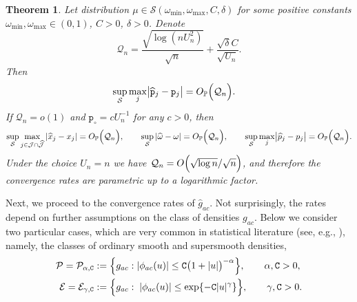\documentclass[numbers,webpdf,imaiai]{ima-authoring-template}%
\theoremstyle{thmstyletwo}%
\newtheorem{theorem}{Theorem}%
\newtheorem{remark}{Remark}%
\renewcommand{\P}{\mathbb{P}}
\newcommand{\p}{\mathtt{p}}
\newcommand{\w}{\omega}
\newcommand{\eps}{\varepsilon}
\newcommand{\mJ}{\mathcal{J}}
\newcommand{\mQ}{\mathcal{Q}}
\numberwithin{equation}{section}
\begin{document}
\begin{theorem}\label{thm1}
Let distribution $\mu \in \mathcal{S}(\w_{\min}, \w_{\max}, C,\delta)$ for some positive constants $\w_{\min}, \w_{\max} \in (0,1)$, $C>0$, \(\delta>0\). Denote
\begin{equation*}
    \mQ_n =
\frac{\sqrt{\log(nU^2_n)}}{\sqrt{n}} + \frac{\sqrt{\delta}C}{\sqrt{U_n}}.
\end{equation*}
Then 
\begin{align}\label{ratepj}
    \sup_{\mathcal{S}} \max_{j} \bigl| \widehat{\p}_j - \p_j \bigr| &= O_{\mathbb{P}}\Bigl(\mQ_n\Bigr).
    \end{align}
If \(\mQ_n=o(1)\) and \(\p_\circ= c U_n^{-1}\) for any \(c>0\), then  
    \begin{align*} 
\sup_{\mathcal{S}} \max_{j \in \mJ \cap \widehat{\mJ}}|\widehat{x}_j - x_j| =   O_{\P} \Bigl( 
\mQ_n        \Bigr), \qquad
\sup_{\mathcal{S}} |\widehat{\w} - \w| =   O_{\P} \Bigl( 
\mQ_n        \Bigr), \qquad 
    \sup_{\mathcal{S}} \max_{j} \bigl| \widehat{p}_j - p_j \bigr| = O_{\mathbb{P}}\Bigl(\mQ_n\Bigr).
\end{align*}
Under the choice $U_n = n$ we have \(
    \mQ_n=O\Bigl(\sqrt{\log n} / \sqrt{n}\Bigr)
\), and therefore the convergence rates are parametric up to a logarithmic factor.
\end{theorem}




Next, we proceed to the convergence rates of $\widehat{g}_{ac}$. Not surprisingly, the rates depend on further assumptions on the class of densities \(g_{ac}\). Below we consider two particular cases, which are very common in statistical literature (see, e.g., \cite{Meister}), namely, the classes of ordinary smooth and supersmooth densities,
\begin{align*}
\mathcal{P}=\mathcal{P}_{\alpha, \mathtt{C}}&:= \Bigl\{g_{ac}:  |\phi_{ac}(u)| \leq \mathtt{C} \bigl(1+|u|\bigr)^{-\alpha}\Bigr\}, \qquad \alpha, \mathtt{C}>0,\\
\mathcal{E}=\mathcal{E}_{\gamma,\mathtt{C}}&:= \Bigl\{g_{ac}: \; |\phi_{ac}(u)| \leq \exp\{-\mathtt{C} |u|^\gamma\} \Bigr\}, \qquad \gamma,\mathtt{C}>0.
\end{align*}
\end{document}
